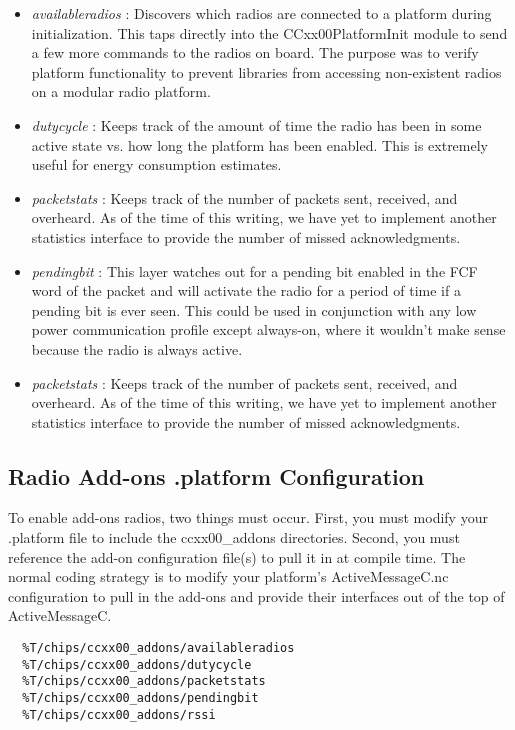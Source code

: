 \documentclass{article}
\begin{document}
\begin{itemize}
	\item \emph{availableradios} : Discovers which radios are connected to 
	a platform during initialization. This taps directly into the 
	CCxx00PlatformInit module to send a few more commands to the radios on 
	board. The purpose was to verify platform functionality to prevent 
	libraries from accessing non-existent radios on a modular radio
	platform.
	
	\item \emph{dutycycle} : Keeps track of the amount of time the radio has been in some active state vs. how long the platform has been enabled. This is extremely useful for energy consumption estimates.
	\item \emph{packetstats} : Keeps track of the number of packets sent, received, and overheard. As of the time of this writing, we have yet to implement another statistics interface to provide the number of missed acknowledgments.
	\item \emph{pendingbit} : This layer watches out for a pending bit enabled in the FCF word of the packet and will activate the radio for a period of time if a pending bit is ever seen. This could be used in conjunction with any low power communication profile except always-on, where it wouldn't make sense because the radio is always active.	
	\item \emph{packetstats} : Keeps track of the number of packets sent, received, and overheard. As of the time of this writing, we have yet to implement another statistics interface to provide the number of missed acknowledgments.
\end{itemize}


\subsection{Radio Add-ons .platform Configuration}
To enable add-ons radios, two things must occur. First, you must modify your .platform file to include the ccxx00\_addons directories. Second, you must reference the add-on configuration file(s) to pull it in at compile time. The normal coding
strategy is to modify your platform's ActiveMessageC.nc configuration to pull in the add-ons and provide their interfaces
out of the top of ActiveMessageC.

\begin{verbatim}
  %T/chips/ccxx00_addons/availableradios
  %T/chips/ccxx00_addons/dutycycle
  %T/chips/ccxx00_addons/packetstats
  %T/chips/ccxx00_addons/pendingbit
  %T/chips/ccxx00_addons/rssi
\end{verbatim}
\end{document}
